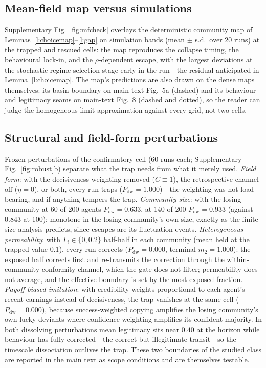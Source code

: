 \documentclass[11pt]{article}
\newcommand{\1}{\mathbf{1}}
\begin{document}
\subsection{Mean-field map versus simulations}
Supplementary Fig.~\ref{fig:mfcheck} overlays the deterministic community map of
Lemmas~\ref{l:choicemap}--\ref{l:gap} on simulation bands (mean $\pm$ s.d.\ over 20 runs)
at the trapped and rescued cells: the map reproduces the collapse timing, the
behavioural lock-in, and the $\rho$-dependent escape, with the largest deviations at the
stochastic regime-selection stage early in the run---the residual anticipated in
Lemma~\ref{l:choicemap}. The map's predictions are also drawn on the dense maps
themselves: its basin boundary on main-text Fig.~5a (dashed) and its behaviour and
legitimacy seams on main-text Fig.~8 (dashed and dotted), so the reader can judge the
homogeneous-limit approximation against every grid, not two cells.

\subsection{Structural and field-form perturbations}
\label{ss:structural}
Frozen perturbations of the confirmatory cell (60 runs each; Supplementary
Fig.~\ref{fig:robust}b) separate what the trap needs from what it merely used.
\emph{Field form}: with the decisiveness weighting removed ($C\equiv1$), the retrospective
channel off ($\eta=0$), or both, every run traps ($P_{\mathrm{dw}}=1.000$)---the weighting
was not load-bearing, and if anything tempers the trap. \emph{Community size}: with the
losing community at 60 of 200 agents $P_{\mathrm{dw}}=0.633$, at 140 of 200
$P_{\mathrm{dw}}=0.933$ (against $0.843$ at 100): monotone in the losing community's own
size, exactly as the finite-size analysis predicts, since escapes are its fluctuation
events. \emph{Heterogeneous permeability}: with $\Gamma_i\in\{0,0.2\}$ half-half in each
community (mean held at the trapped value $0.1$), every run corrects
($P_{\mathrm{dw}}=0.000$, terminal $m_2=1.000$): the exposed half corrects first and
re-transmits the correction through the within-community conformity channel, which the
gate does not filter; permeability does not average, and the effective boundary is set by
the most exposed fraction. \emph{Payoff-biased imitation}: with credibility weights
proportional to each agent's recent earnings instead of decisiveness, the trap vanishes
at the same cell ($P_{\mathrm{dw}}=0.000$), because success-weighted copying amplifies the
losing community's own lucky deviants where confidence weighting amplifies its confident
majority. In both dissolving perturbations mean legitimacy sits near $0.40$ at the
horizon while behaviour has fully corrected---the correct-but-illegitimate transit---so
the timescale dissociation outlives the trap. These two boundaries of the studied class
are reported in the main text as scope conditions and are themselves testable.
\end{document}
